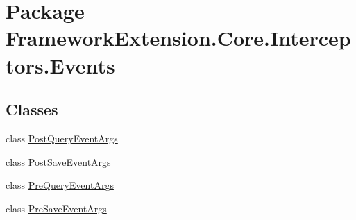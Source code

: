 \hypertarget{namespace_framework_extension_1_1_core_1_1_interceptors_1_1_events}{\section{Package Framework\-Extension.\-Core.\-Interceptors.\-Events}
\label{namespace_framework_extension_1_1_core_1_1_interceptors_1_1_events}
}
\subsection*{Classes}
\begin{DoxyCompactItemize}
\item 
class \hyperlink{class_framework_extension_1_1_core_1_1_interceptors_1_1_events_1_1_post_query_event_args}{Post\-Query\-Event\-Args}
\item 
class \hyperlink{class_framework_extension_1_1_core_1_1_interceptors_1_1_events_1_1_post_save_event_args}{Post\-Save\-Event\-Args}
\item 
class \hyperlink{class_framework_extension_1_1_core_1_1_interceptors_1_1_events_1_1_pre_query_event_args}{Pre\-Query\-Event\-Args}
\item 
class \hyperlink{class_framework_extension_1_1_core_1_1_interceptors_1_1_events_1_1_pre_save_event_args}{Pre\-Save\-Event\-Args}
\end{DoxyCompactItemize}
